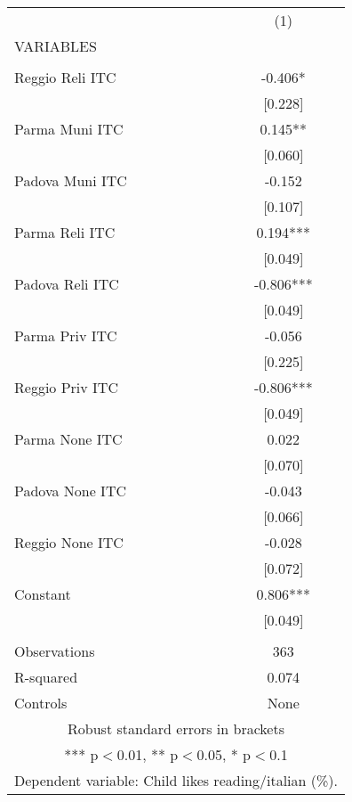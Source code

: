 \begin{tabular}{lc} \hline
 & (1) \\
VARIABLES &  \\ \hline
 &  \\
Reggio Reli ITC & -0.406* \\
 & [0.228] \\
Parma Muni ITC & 0.145** \\
 & [0.060] \\
Padova Muni ITC & -0.152 \\
 & [0.107] \\
Parma Reli ITC & 0.194*** \\
 & [0.049] \\
Padova Reli ITC & -0.806*** \\
 & [0.049] \\
Parma Priv ITC & -0.056 \\
 & [0.225] \\
Reggio Priv ITC & -0.806*** \\
 & [0.049] \\
Parma None ITC & 0.022 \\
 & [0.070] \\
Padova None ITC & -0.043 \\
 & [0.066] \\
Reggio None ITC & -0.028 \\
 & [0.072] \\
Constant & 0.806*** \\
 & [0.049] \\
 &  \\
Observations & 363 \\
R-squared & 0.074 \\
 Controls & None \\ \hline
\multicolumn{2}{c}{ Robust standard errors in brackets} \\
\multicolumn{2}{c}{ *** p$<$0.01, ** p$<$0.05, * p$<$0.1} \\
\multicolumn{2}{c}{ Dependent variable: Child likes reading/italian (\%).} \\
\end{tabular}
